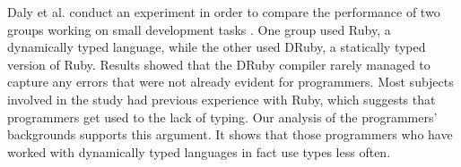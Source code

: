 \documentclass[]{sigplanconf}
\begin{document}
% 

Daly et al. conduct an experiment in order to compare the performance of two groups working on small development tasks \cite{ruby_vs_druby}.
One group used Ruby, a dynamically typed language, while the other used DRuby, a statically typed version of Ruby. 
Results showed that the DRuby compiler rarely managed to capture any errors that were not already evident for programmers.
Most subjects involved in the study had previous experience with Ruby, which suggests that programmers get used to the lack of typing.
Our analysis of the programmers' backgrounds supports this argument.
It shows that those programmers who have worked with dynamically typed languages in fact use types less often.








%
%
\end{document}
